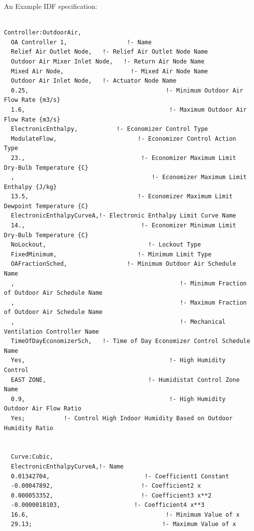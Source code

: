 An Example IDF specification:

\begin{lstlisting}

Controller:OutdoorAir,
  OA Controller 1,                 !- Name
  Relief Air Outlet Node,   !- Relief Air Outlet Node Name
  Outdoor Air Mixer Inlet Node,   !- Return Air Node Name
  Mixed Air Node,                   !- Mixed Air Node Name
  Outdoor Air Inlet Node,   !- Actuator Node Name
  0.25,                                       !- Minimum Outdoor Air Flow Rate {m3/s}
  1.6,                                         !- Maximum Outdoor Air Flow Rate {m3/s}
  ElectronicEnthalpy,           !- Economizer Control Type
  ModulateFlow,                       !- Economizer Control Action Type
  23.,                                 !- Economizer Maximum Limit Dry-Bulb Temperature {C}
  ,                                       !- Economizer Maximum Limit Enthalpy {J/kg}
  13.5,                               !- Economizer Maximum Limit Dewpoint Temperature {C}
  ElectronicEnthalpyCurveA,!- Electronic Enthalpy Limit Curve Name
  14.,                                 !- Economizer Minimum Limit Dry-Bulb Temperature {C}
  NoLockout,                             !- Lockout Type
  FixedMinimum,                       !- Minimum Limit Type
  OAFractionSched,                 !- Minimum Outdoor Air Schedule Name
  ,                                               !- Minimum Fraction of Outdoor Air Schedule Name
  ,                                               !- Maximum Fraction of Outdoor Air Schedule Name
  ,                                               !- Mechanical Ventilation Controller Name
  TimeOfDayEconomizerSch,   !- Time of Day Economizer Control Schedule Name
  Yes,                                         !- High Humidity Control
  EAST ZONE,                             !- Humidistat Control Zone Name
  0.9,                                         !- High Humidity Outdoor Air Flow Ratio
  Yes;           !- Control High Indoor Humidity Based on Outdoor Humidity Ratio


  Curve:Cubic,
  ElectronicEnthalpyCurveA,!- Name
  0.01342704,                           !- Coefficient1 Constant
  -0.00047892,                         !- Coefficient2 x
  0.000053352,                         !- Coefficient3 x**2
  -0.0000018103,                     !- Coefficient4 x**3
  16.6,                                       !- Minimum Value of x
  29.13;                                     !- Maximum Value of x
\end{lstlisting}

